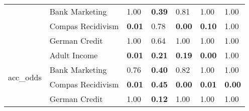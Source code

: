 \begin{tabular}{lllllll}
 & Bank Marketing & 1.00 & \textbf{0.39} & 0.81 & 1.00 & 1.00 \\
 & Compas Recidivism & \textbf{0.01} & 0.78 & \textbf{0.00} & \textbf{0.10} & 1.00 \\
 & German Credit & 1.00 & 0.64 & 1.00 & 1.00 & 1.00 \\
\cline{1-7}
\multirow[t]{4}{*}{acc_odds} & Adult Income & \textbf{0.01} & \textbf{0.21} & \textbf{0.19} & \textbf{0.00} & 1.00 \\
 & Bank Marketing & 0.76 & \textbf{0.40} & 0.82 & 1.00 & 1.00 \\
 & Compas Recidivism & \textbf{0.01} & \textbf{0.45} & \textbf{0.00} & \textbf{0.01} & \textbf{0.00} \\
 & German Credit & 1.00 & \textbf{0.12} & 1.00 & 1.00 & 1.00 \\
\cline{1-7}
\bottomrule
\end{tabular}
